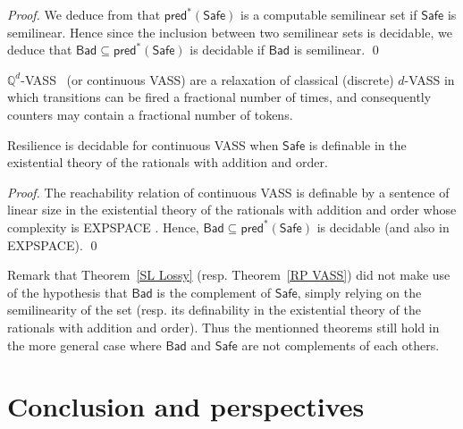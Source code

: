 \documentclass[runningheads]{llncs}
\newcommand{\pred}{\textsf{pred}}
\newcommand{\Bad}{\textsf{Bad}}
\newcommand{\Safe}{\textsf{Safe}}
\begin{document}
\begin{proof}
We deduce from \cite[Theorem 3.6]{DBLP:conf/rp/Schnoebelen10} 
that $\pred^*(\Safe)$ is a computable semilinear set if $\Safe$ is semilinear. Hence since the inclusion between two semilinear sets is decidable, we deduce that $\Bad \subseteq \pred^*(\Safe)$ is decidable if $\Bad$ is semilinear. \qed
\end{proof}






$\mathds{Q}^d$-VASS~\cite{DBLP:journals/tocl/BlondinFHH17} (or continuous VASS) are a relaxation of classical (discrete) $d$-VASS in which transitions can be fired a fractional number of times, and consequently counters may contain a fractional number of tokens.

\begin{theorem}\label{RP VASS}
{\sc Resilience} is decidable for continuous VASS when $\Safe$  is
definable in the existential theory of the rationals with addition and order.
\end{theorem}

\begin{proof}
The reachability relation of continuous VASS is definable by a sentence of linear size in the existential theory of
the rationals with addition and order whose complexity is EXPSPACE \cite{DBLP:journals/tocl/BlondinFHH17}. Hence, $\Bad \subseteq \pred^*(\Safe)$ is decidable (and also in EXPSPACE). \qed
\end{proof}


Remark that
Theorem~\ref{SL Lossy} 
(resp. Theorem~\ref{RP VASS})
did not make use of the hypothesis that $\Bad$ is the complement of $\Safe$, simply relying on the
semilinearity of the set (resp. its definability in the existential theory of the rationals with addition and order). Thus 
the mentionned theorems still hold in the more general case where $\Bad$ and $\Safe$ are not complements of each others.










\section{Conclusion and perspectives}
\end{document}
